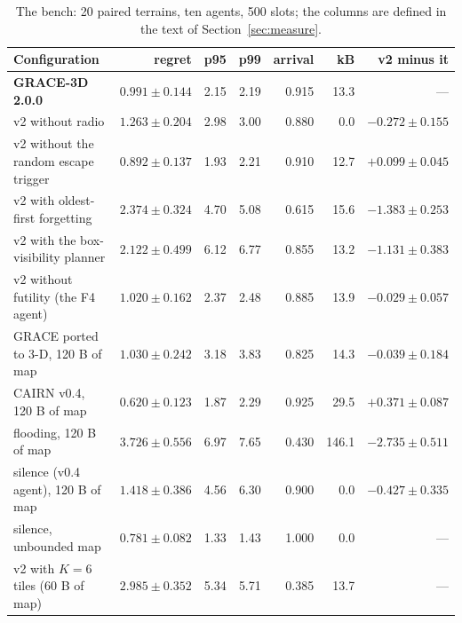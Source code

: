 \documentclass[11pt,a4paper]{article}
\begin{document}
\begin{table}[htbp]\centering\small
\begin{tabularx}{\linewidth}{Lrrrrrr}
\toprule
Configuration & regret & p95 & p99 & arrival & kB & v2 minus it \\
\midrule
\textbf{GRACE-3D 2.0.0} & $0.991\pm0.144$ & 2.15 & 2.19 & 0.915 & 13.3 & --- \\
v2 without radio & $1.263\pm0.204$ & 2.98 & 3.00 & 0.880 & 0.0 & $-0.272\pm0.155$ \\
v2 without the random escape trigger & $0.892\pm0.137$ & 1.93 & 2.21 & 0.910 & 12.7 & $+0.099\pm0.045$ \\
v2 with oldest-first forgetting & $2.374\pm0.324$ & 4.70 & 5.08 & 0.615 & 15.6 & $-1.383\pm0.253$ \\
v2 with the box-visibility planner & $2.122\pm0.499$ & 6.12 & 6.77 & 0.855 & 13.2 & $-1.131\pm0.383$ \\
v2 without futility (the F4 agent) & $1.020\pm0.162$ & 2.37 & 2.48 & 0.885 & 13.9 & $-0.029\pm0.057$ \\
GRACE ported to 3-D, 120 B of map & $1.030\pm0.242$ & 3.18 & 3.83 & 0.825 & 14.3 & $-0.039\pm0.184$ \\
CAIRN v0.4, 120 B of map & $0.620\pm0.123$ & 1.87 & 2.29 & 0.925 & 29.5 & $+0.371\pm0.087$ \\
flooding, 120 B of map & $3.726\pm0.556$ & 6.97 & 7.65 & 0.430 & 146.1 & $-2.735\pm0.511$ \\
silence (v0.4 agent), 120 B of map & $1.418\pm0.386$ & 4.56 & 6.30 & 0.900 & 0.0 & $-0.427\pm0.335$ \\
silence, unbounded map & $0.781\pm0.082$ & 1.33 & 1.43 & 1.000 & 0.0 & --- \\
v2 with $K=6$ tiles (60 B of map) & $2.985\pm0.352$ & 5.34 & 5.71 & 0.385 & 13.7 & --- \\
\bottomrule
\end{tabularx}
\caption{The bench: 20 paired terrains, ten agents, 500 slots; the columns are defined in the text of
Section~\ref{sec:measure}.}
\label{tab:bench}
\end{table}
\end{document}
